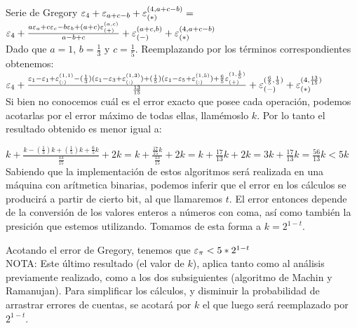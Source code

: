 \begin{section}{Serie de Gregory}
	$\varepsilon _{4} + \varepsilon _{a+c-b} + \varepsilon _{({*})}^{({4,a+c-b})} =$\\
	
	$\varepsilon _{4} + \frac{a\varepsilon _{a} + c\varepsilon _{c} - b\varepsilon _{b} + (a+c)\varepsilon _{({+})}^{({a,c})}}{a-b+c} + \varepsilon _{({-})}^{({a+c,b})} + \varepsilon _{({*})}^{({4,a+c-b})}$\\
	
	Dado que $a=1$, $b=\frac{1}{3}$ y $c=\frac{1}{5}$. Reemplazando por los términos correspondientes obtenemos:\\
	
	$\varepsilon _{4} + \frac{\varepsilon _{1} - \varepsilon _{1} + \varepsilon _{({:})}^{({1,1})} - (\frac{1}{3})(\varepsilon _{1} - \varepsilon _{3} + \varepsilon _{({:})}^{({1,3})}) + (\frac{1}{5})(\varepsilon _{1} - \varepsilon _{5} + \varepsilon _{({:})}^{({1,5})}) + \frac{6}{5} \varepsilon _{({+})}^{({1,\frac{1}{5}})}}{\frac{13}{15}} + \varepsilon _{({-})}^{({\frac{6}{5},\frac{1}{3}})} + \varepsilon _{({*})}^{({4,\frac{13}{15}})}$\\
	
	Si bien no conocemos cuál es el error exacto que posee cada operación, podemos acotarlas por el error máximo de todas ellas, llamémoslo $k$. Por lo tanto el resultado obtenido es menor igual a:

$k + \frac{k - (\frac{1}{3})k + (\frac{1}{5})k + \frac{6}{5}k}{\frac{13}{15}} + 2k = k + \frac{\frac{17}{15}k}{\frac{13}{15}} + 2k = k + \frac{17}{13}k + 2k = 3k + \frac{17}{13}k = \frac{56}{13}k < 5k $ \\

	Sabiendo que la implementación de estos algoritmos será realizada en una máquina con arítmetica binarias, podemos inferir que el error en los cálculos se producirá a partir de cierto bit, al que llamaremos $t$. El error entonces depende de la conversión de los valores enteros a números con coma, así como también la presición que estemos utilizando. Tomamos de esta forma a $k=2^{1-t}$.
	
	Acotando el error de Gregory, tenemos que $\varepsilon _{\pi} < 5*2^{1-t}$\\
	
	NOTA: Este último resultado (el valor de $k$), aplica tanto como al análisis previamente realizado, como a los dos subsiguientes (algoritmo de Machin y Ramanujan). Para simplificar los cálculos, y disminuir la probabilidad de arrastrar errores de cuentas, se acotará por $k$ el que luego será reemplazado por $2^{1-t}$.
	
\end{section}

